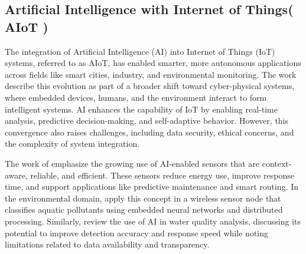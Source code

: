 \documentclass[conference]{IEEEtran}
\begin{document}
\subsection{Artificial Intelligence with Internet of Things( AIoT )}

The integration of Artificial Intelligence (AI) into Internet of Things (IoT) systems, referred to as AIoT, has enabled smarter, more autonomous applications across fields like smart cities, industry, and environmental monitoring. The work \cite{ghosh_2018_artificial} describe this evolution as part of a broader shift toward cyber-physical systems, where embedded devices, humans, and the environment interact to form intelligent systems. AI enhances the capability of IoT by enabling real-time analysis, predictive decision-making, and self-adaptive behavior. However, this convergence also raises challenges, including data security, ethical concerns, and the complexity of system integration.

The work of \cite{mukhopadhyay_2021_artificial} emphasize the growing use of AI-enabled sensors that are context-aware, reliable, and efficient. These sensors reduce energy use, improve response time, and support applications like predictive maintenance and smart routing. In the environmental domain, \cite{ferreira_2023_conception} apply this concept in a wireless sensor node that classifies aquatic pollutants using embedded neural networks and distributed processing. Similarly, \cite{nr_2025_ai} review the use of AI in water quality analysis, discussing its potential to improve detection accuracy and response speed while noting limitations related to data availability and transparency.


\end{document}
